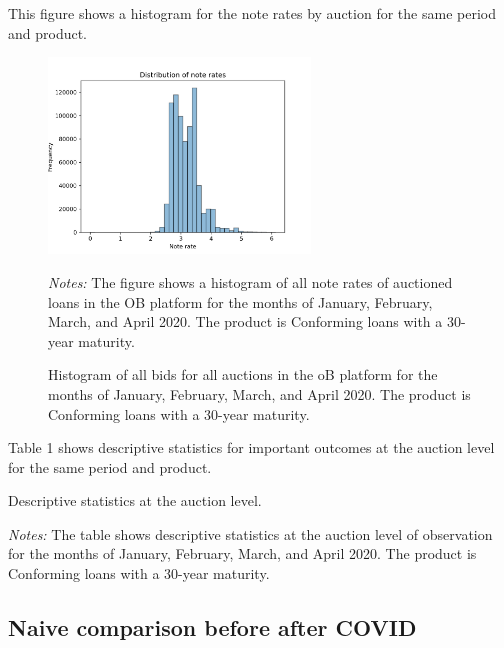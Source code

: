 \documentclass[11pt,a4paper]{article}
\begin{document}
This figure shows a histogram for the note rates by auction for the same period and product.
\begin{figure}[h]
  \centering
  \includegraphics[width=0.62\textwidth]{../results/figures/distribution_of_noterates.png}
  \caption{Histogram of all bids for all auctions in the oB platform for the months of January, February, March, and April 2020. The product is Conforming loans with a 30-year maturity.}
  \begin{minipage}{\textwidth}
      \footnotesize{\textit{Notes:} The figure shows a histogram of all note rates of auctioned loans in the OB platform for the months of January, February, March, and April 2020. The product is Conforming loans with a 30-year maturity. } 
      \end{minipage}
\end{figure}


\pagebreak
Table 1 shows descriptive statistics for important outcomes at the auction level for the same period and product. 


\begin{table}[h]
    \centering
    
    \caption{Descriptive statistics at the auction level. }
    \begin{minipage}{\textwidth}
        \footnotesize{\textit{Notes:} The table shows descriptive statistics at the auction level of observation for the months of January, February, March, and April 2020. The product is Conforming loans with a 30-year maturity. } 
        \end{minipage}
\end{table}


\subsection{Naive comparison before after COVID}
\end{document}
